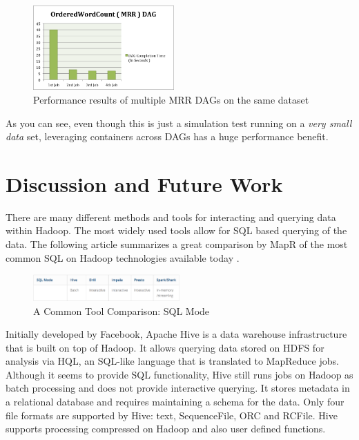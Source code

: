 \documentclass[twocolumn]{article}
\begin{document}
\begin{figure}[htb]
        \centering
        \includegraphics[width=0.48\textwidth]{sessions-tez2}
        \caption{Performance results of multiple MRR DAGs on the same dataset}
        \label{fig18}
\end{figure}

As you can see, even though this is just a simulation test running on a
\emph{very small data} set, leveraging containers across DAGs has a huge
performance benefit.

\section{Discussion and Future Work}
There are many different methods and tools for interacting and querying data within Hadoop. The most widely used tools allow for SQL based querying of the data. The following article summarizes a great comparison by MapR of the most common SQL on Hadoop technologies available today \cite{Intelli:2014}.

\begin{figure}[htb]
        \centering
        \includegraphics[width=0.5\textwidth]{dst01}
        \caption{A Common Tool Comparison: SQL Mode}
        \label{dst01}
\end{figure}

Initially developed by Facebook, Apache Hive is a data warehouse infrastructure that is built on top of Hadoop. It allows querying data stored on HDFS for analysis via HQL, an SQL-like language that is translated to MapReduce jobs. Although it seems to provide SQL functionality, Hive still runs jobs on Hadoop as batch processing and does not provide interactive querying. It stores metadata in a relational database and requires maintaining a schema for the data. Only four file formats are supported by Hive: text, SequenceFile, ORC and RCFile. Hive supports processing compressed on Hadoop and also user defined functions.
\end{document}
